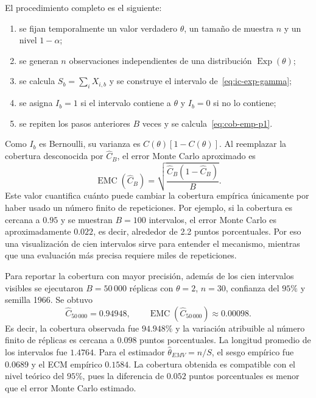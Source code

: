 \documentclass[10pt,a4paper,oneside]{article}
\begin{document}
El procedimiento completo es el siguiente:
\begin{enumerate}
\item se fijan temporalmente un valor verdadero $\theta$, un tamaño de muestra $n$ y un nivel $1-\alpha$;
\item se generan $n$ observaciones independientes de una distribución $\operatorname{Exp}(\theta)$;
\item se calcula $S_b=\sum_iX_{i,b}$ y se construye el intervalo de~\eqref{eq:ic-exp-gamma};
\item se asigna $I_b=1$ si el intervalo contiene a $\theta$ y $I_b=0$ si no lo contiene;
\item se repiten los pasos anteriores $B$ veces y se calcula~\eqref{eq:cob-emp-p1}.
\end{enumerate}

Como $I_b$ es Bernoulli, su varianza es $C(\theta)[1-C(\theta)]$. Al reemplazar la cobertura desconocida por $\widehat C_B$, el error Monte Carlo aproximado es
\begin{equation*}
\operatorname{EMC}(\widehat C_B)
=\sqrt{\frac{\widehat C_B(1-\widehat C_B)}{B}}.
\end{equation*}
Este valor cuantifica cuánto puede cambiar la cobertura empírica únicamente por haber usado un número finito de repeticiones. Por ejemplo, si la cobertura es cercana a $0.95$ y se muestran $B=100$ intervalos, el error Monte Carlo es aproximadamente $0.022$, es decir, alrededor de 2.2 puntos porcentuales. Por eso una visualización de cien intervalos sirve para entender el mecanismo, mientras que una evaluación más precisa requiere miles de repeticiones.

Para reportar la cobertura con mayor precisión, además de los cien intervalos visibles se ejecutaron $B=50\,000$ réplicas con $\theta=2$, $n=30$, confianza del $95\%$ y semilla 1966. Se obtuvo
\begin{equation*}
\widehat C_{50\,000}=0.94948,
\qquad
\operatorname{EMC}(\widehat C_{50\,000})\approx0.00098.
\end{equation*}
Es decir, la cobertura observada fue $94.948\%$ y la variación atribuible al número finito de réplicas es cercana a $0.098$ puntos porcentuales. La longitud promedio de los intervalos fue $1.4764$. Para el estimador $\widehat\theta_{EMV}=n/S$, el sesgo empírico fue $0.0689$ y el ECM empírico $0.1584$. La cobertura obtenida es compatible con el nivel teórico del $95\%$, pues la diferencia de $0.052$ puntos porcentuales es menor que el error Monte Carlo estimado.
\end{document}
